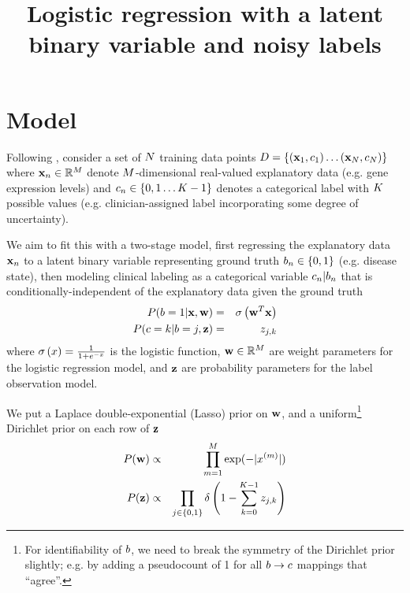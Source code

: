 \documentclass{article}
\begin{document}

\title{Logistic regression with a latent binary variable and noisy labels}

\maketitle

\section{Model}

Following \cite{BootkrajangKaban2012},
consider a set of $N$ training data points
$D = \left\{ ({\bf x}_1,c_1) \ldots ({\bf x}_N,c_N) \right\}$
where
${\bf x}_n \in \mathbb{R}^M$
denote $M$-dimensional real-valued explanatory data (e.g. gene expression levels)
and
$c_n \in \left\{ 0, 1 \ldots K - 1 \right\}$
denotes a categorical label with $K$ possible values
(e.g. clinician-assigned label incorporating some degree of uncertainty).

We aim to fit this with a two-stage model,
first regressing the explanatory data ${\bf x}_n$ to a latent binary variable representing ground truth
$b_n \in \left\{ 0, 1 \right\}$
(e.g. disease state),
then modeling clinical labeling as a categorical variable $c_n | b_n$
that is conditionally-independent of the explanatory data given the ground truth
\begin{eqnarray*}
P(b = 1 | {\bf x}, {\bf w}) & = & \sigma\left({\bf w}^T {\bf x}\right) \\
P(c = k | b = j, {\bf z}) & = & z_{j,k}
\end{eqnarray*}
where
$\sigma\left(x\right) = \frac{1}{1+e^{-x}}$ is the logistic function,
${\bf w} \in \mathbb{R}^M$ are weight parameters for the logistic regression model, and
${\bf z}$ are probability parameters for the label observation model.

We put a Laplace double-exponential (Lasso) prior on ${\bf w}$, and a uniform\footnote{
  For identifiability of $b$, we need to break the symmetry of the Dirichlet prior slightly;
  e.g. by adding a pseudocount of 1 for all $b \to c$ mappings that ``agree''.
} Dirichlet prior on each row of ${\bf z}$
\begin{eqnarray*}
P({\bf w}) & \propto & \prod_{m=1}^{M} \exp(-|x^{(m)}|) \\
P({\bf z}) & \propto & \prod_{j \in \{0,1\}} \delta \left( 1 - \sum_{k=0}^{K-1} z_{j,k} \right)
\end{eqnarray*}
\end{document}
